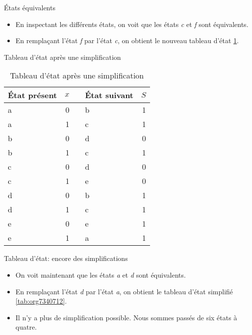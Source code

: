\documentclass[presentation]{beamer}
\begin{document}
\begin{frame}[label={sec:orgf8b9a65}]{États équivalents}
\begin{itemize}
\item En inspectant les différents états, on voit que les états \emph{c} et \emph{f} sont équivalents.

\item En remplaçant l'état \emph{f} par l'état \emph{c}, on obtient le nouveau tableau d'état \ref{tab:org873a3ec}.
\end{itemize}
\end{frame}

\begin{frame}[label={sec:org63fb519}]{Tableau d'état après une simplification}
\begin{table}[htbp]
\caption{\label{tab:org873a3ec}Tableau d'état après une simplification}
\centering
\begin{tabular}{lrllr}
État présent & \(x\) &  & État suivant & \(S\)\\
\hline
a & 0 &  & b & 1\\
a & 1 &  & c & 1\\
b & 0 &  & d & 0\\
b & 1 &  & c & 1\\
c & 0 &  & d & 0\\
c & 1 &  & e & 0\\
d & 0 &  & b & 1\\
d & 1 &  & c & 1\\
e & 0 &  & e & 1\\
e & 1 &  & a & 1\\
\end{tabular}
\end{table}
\end{frame}

\begin{frame}[label={sec:orgd3e3c43}]{Tableau d'état: encore des simplifications}
\begin{itemize}
\item On voit maintenant que les états \emph{a} et \emph{d} sont équivalents.

\item En remplaçant l'état \emph{d} par l'état \emph{a}, on obtient le tableau d'état simplifié \ref{tab:org7340712}.

\item Il n'y a plus de simplification possible. Nous sommes passés de six états à quatre.
\end{itemize}
\end{frame}
\end{document}
